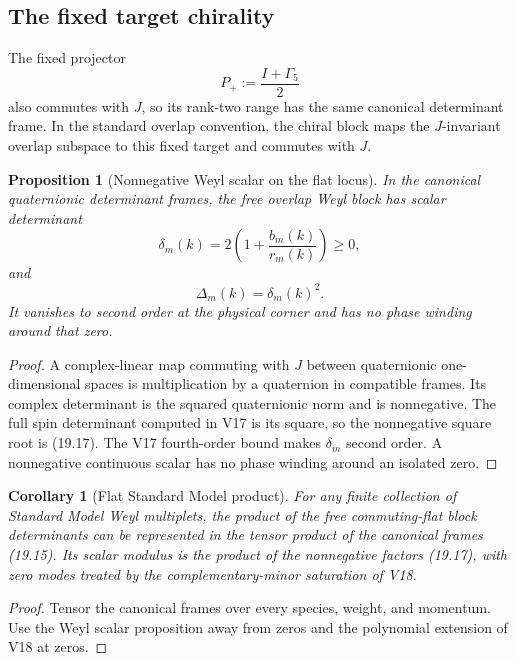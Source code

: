 \documentclass[11pt]{article}
\newtheorem{proposition}[theorem]{Proposition}
\newtheorem{corollary}[theorem]{Corollary}
\begin{document}
\subsection{The fixed target chirality}

The fixed projector
\[
 P_+:=\frac{I+\Gamma_5}{2}
 \tag{19.16}
\]
also commutes with \(J\), so its rank-two range has the same canonical
determinant frame.  In the standard overlap convention, the chiral block
maps the \(J\)-invariant overlap subspace to this fixed target and
commutes with \(J\).

\begin{proposition}[Nonnegative Weyl scalar on the flat locus]
\label{prop:v11v19-weyl-scalar}
In the canonical quaternionic determinant frames, the free overlap Weyl
block has scalar determinant
\[
 \delta_m(k)=2\left(1+\frac{b_m(k)}{r_m(k)}\right)\geq0,
 \tag{19.17}
\]
and
\[
 \Delta_m(k)=\delta_m(k)^2.
 \tag{19.18}
\]
It vanishes to second order at the physical corner and has no phase
winding around that zero.
\end{proposition}

\begin{proof}
A complex-linear map commuting with \(J\) between quaternionic
one-dimensional spaces is multiplication by a quaternion in compatible
frames.  Its complex determinant is the squared quaternionic norm and is
nonnegative.  The full spin determinant computed in V17 is its square,
so the nonnegative square root is (19.17).  The V17 fourth-order bound
makes \(\delta_m\) second order.  A nonnegative continuous scalar has no
phase winding around an isolated zero.
\end{proof}

\begin{corollary}[Flat Standard Model product]
\label{cor:v11v19-sm-flat}
For any finite collection of Standard Model Weyl multiplets, the product
of the free commuting-flat block determinants can be represented in the
tensor product of the canonical frames (19.15).  Its scalar modulus is the
product of the nonnegative factors (19.17), with zero modes treated by
the complementary-minor saturation of V18.
\end{corollary}

\begin{proof}
Tensor the canonical frames over every species, weight, and momentum.
Use the Weyl scalar proposition away from zeros and the polynomial
extension of V18 at zeros.
\end{proof}
\end{document}
